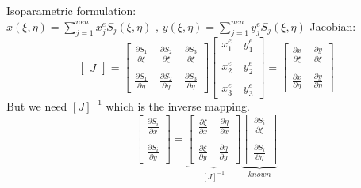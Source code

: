 \documentclass[t,english]{beamer}
\begin{document}
\begin{frame}
Isoparametric formulation:
$x(\xi,\eta) = \sum_{j=1}^{nen} x_j^e S_j(\xi,\eta) \text{ , }
 y(\xi,\eta) = \sum_{j=1}^{nen} y_j^e S_j(\xi,\eta)$
 Jacobian:
 $$\begin{bmatrix}J\end{bmatrix} = \begin{bmatrix}
\frac{\partial S_1}{\partial \xi} \quad \frac{\partial S_2}{\partial \xi}\quad \frac{\partial S_3}{\partial \xi}\\ \\ \frac{\partial S_1}{\partial \eta} \quad \frac{\partial S_2}{\partial \eta}\quad \frac{\partial S_3}{\partial \eta} 
\end{bmatrix} \begin{bmatrix}
x_1^e \quad y_1^e\\ \\ x_2^e \quad y_2^e \\ \\ x_3^e \quad y_3^e\end{bmatrix} = \begin{bmatrix}
\frac{\partial x}{\partial \xi} \quad \frac{\partial y}{\partial \xi}\\ \\ \frac{\partial x}{\partial \eta} \quad \frac{\partial y}{\partial \eta} 
\end{bmatrix}$$
But we need $[J]^{-1}$ which is the inverse mapping. 
$$\begin{bmatrix}
\frac{\partial S_i}{\partial x} \\ \\ \frac{\partial S_i}{\partial y}
\end{bmatrix} = \underbrace{\begin{bmatrix}
\frac{\partial \xi}{\partial x} \quad \frac{\partial \eta}{\partial x}\\ \\ \frac{\partial \xi}{\partial y} \quad \frac{\partial \eta}{\partial y} 
\end{bmatrix}}_{[J]^{-1}}\underbrace{\begin{bmatrix}
\frac{\partial S_i}{\partial \xi} \\ \\ \frac{\partial S_i}{\partial \eta}
\end{bmatrix}}_{known} $$
\end{frame}
\end{document}
